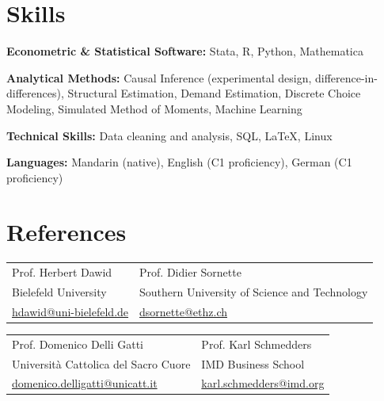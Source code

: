 \documentclass[a4paper,11pt]{article}
\begin{document}
\section{Skills}

\textbf{Econometric \& Statistical Software:} Stata, R, Python, Mathematica  

\textbf{Analytical Methods:} Causal Inference (experimental design, difference-in-differences), Structural Estimation, Demand Estimation, Discrete Choice Modeling, Simulated Method of Moments, Machine Learning  

\textbf{Technical Skills:} Data cleaning and analysis, SQL, \LaTeX, Linux  

\textbf{Languages:} Mandarin (native), English (C1 proficiency), German (C1 proficiency)

\section{References}

\begin{tabularx}{\linewidth}{X X}
Prof. Herbert Dawid & Prof. Didier Sornette \\
Bielefeld University & Southern University of Science and Technology \\
\href{mailto:hdawid@uni-bielefeld.de}{hdawid@uni-bielefeld.de} &
\href{mailto:dsornette@ethz.ch}{dsornette@ethz.ch}
\end{tabularx}

\vspace{6pt}

\begin{tabularx}{\linewidth}{X X}
Prof. Domenico Delli Gatti & Prof. Karl Schmedders \\
Università Cattolica del Sacro Cuore & IMD Business School \\
\href{mailto:domenico.delligatti@unicatt.it}{domenico.delligatti@unicatt.it} &
\href{mailto:karl.schmedders@imd.org}{karl.schmedders@imd.org}
\end{tabularx}
\end{document}
